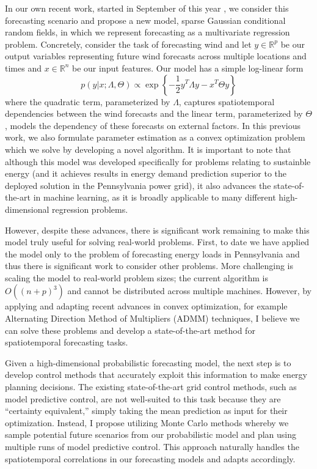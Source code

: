 \documentclass[12pt]{article}
\begin{document}
In our own recent work, started in September of this year \cite{wytock.12}, we consider this forecasting scenario and propose a new model, sparse Gaussian conditional random fields, in which we represent forecasting as a multivariate regression problem. Concretely, consider the task of forecasting wind and let $y \in \mathbb{R}^p$ be our output variables representing future wind forecasts across multiple locations and times and $x \in \mathbb{R}^n$ be our input features. Our model has a simple log-linear form
\begin{equation}
p(y|x;\Lambda,\Theta) \propto \exp \left\{ -\frac{1}{2}y^T\Lambda y - x^T\Theta y \right\}
\end{equation}
where the quadratic term, parameterized by $\Lambda$, captures spatiotemporal dependencies between the wind forecasts and the linear term, parameterized by $\Theta$, models the dependency of these forecasts on external factors. In this previous work, we also formulate parameter estimation as a convex optimization problem which we solve by developing a novel algorithm. It is important to note that although this model was developed specifically for problems relating to sustainble energy (and it achieves results in energy demand prediction superior to the deployed solution in the Pennsylvania power grid), it also advances the state-of-the-art in machine learning, as it is broadly applicable to many different high-dimensional regression problems.

However, despite these advances, there is significant work remaining to make this model truly useful for solving real-world problems. First, to date we have applied the model only to the problem of forecasting energy loads in Pennsylvania and thus there is significant work to consider other problems. More challenging is scaling the model to real-world problem sizes; the current algorithm is $O((n+p)^3)$ and cannot be distributed across multiple machines. However, by applying and adapting recent advances in convex optimization, for example Alternating Direction Method of Multipliers (ADMM) techniques, I believe we can solve these problems and develop a state-of-the-art method for spatiotemporal forecasting tasks.

Given a high-dimensional probabilistic forecasting model, the next step is to develop control methods that accurately exploit this information to make energy planning decisions. The existing state-of-the-art grid control methods, such as model predictive control, are not well-suited to this task because they are ``certainty equivalent,'' simply taking the mean prediction as input for their optimization. Instead, I propose utilizing Monte Carlo methods whereby we sample potential future scenarios from our probabilistic model and plan using multiple runs of model predictive control. This approach naturally handles the spatiotemporal correlations in our forecasting models and adapts accordingly.
\end{document}
